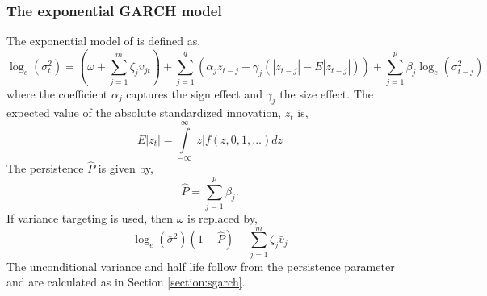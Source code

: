 \subsubsection{The exponential GARCH model}\label{section:egarch}
The exponential model of \cite{Nelson1991} is defined as,
\begin{equation}\label{eq:egarch}
{\log _e}\left( {\sigma _t^2} \right) = \left( {\omega  + \sum\limits_{j = 1}^m {{\zeta _j}{v_{jt}}} } \right) + \sum\limits_{j = 1}^q {\left( {{\alpha _j}{z_{t - j}} + {\gamma _j}\left( {\left| {{z_{t - j}}} \right| - E\left| {{z_{t - j}}} \right|} \right)} \right) + } \sum\limits_{j = 1}^p {{\beta _j}{{\log }_e}\left( {\sigma _{t - j}^2} \right)}
\end{equation}
where the coefficient $\alpha_j$ captures the sign effect and $\gamma_j$ the
size effect. The expected value of the absolute standardized innovation, $z_t$
is,
\begin{equation}\label{eq:egarchE}
E\left| {{z_t}} \right| = \int\limits_{ - \infty }^\infty  {\left| z \right|} f\left( {z,0,1,...} \right)dz
\end{equation}
The persistence $\hat P$ is given by,
\begin{equation}\label{eq:egarchp}
\hat P = \sum\limits_{j = 1}^p {{\beta _j}}.
\end{equation}
If variance targeting is used, then $\omega$ is replaced by,
\begin{equation}\label{eq:egarchvt}
{\log _e}\left( {{{\bar \sigma }^2}} \right)\left( {1 - \hat P} \right) - \sum\limits_{j = 1}^m {{\zeta _j}{{\bar v}_j}}
\end{equation}
The unconditional variance and half life follow from the persistence parameter
and are calculated as in Section \ref{section:sgarch}.

